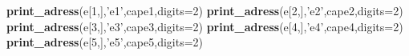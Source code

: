 \documentclass[]{article}
\newenvironment{Shaded}{\begin{snugshade}}{\end{snugshade}}
\newcommand{\KeywordTok}[1]{\textcolor[rgb]{0.13,0.29,0.53}{\textbf{{#1}}}}
\newcommand{\DataTypeTok}[1]{\textcolor[rgb]{0.13,0.29,0.53}{{#1}}}
\newcommand{\DecValTok}[1]{\textcolor[rgb]{0.00,0.00,0.81}{{#1}}}
\newcommand{\StringTok}[1]{\textcolor[rgb]{0.31,0.60,0.02}{{#1}}}
\newcommand{\NormalTok}[1]{{#1}}
\begin{document}
\begin{Shaded}
\begin{Highlighting}[]
\KeywordTok{print_adress}\NormalTok{(e[}\DecValTok{1}\NormalTok{,],}\StringTok{'e1'}\NormalTok{,cape1,}\DataTypeTok{digits=}\DecValTok{2}\NormalTok{)}
\KeywordTok{print_adress}\NormalTok{(e[}\DecValTok{2}\NormalTok{,],}\StringTok{'e2'}\NormalTok{,cape2,}\DataTypeTok{digits=}\DecValTok{2}\NormalTok{)}
\KeywordTok{print_adress}\NormalTok{(e[}\DecValTok{3}\NormalTok{,],}\StringTok{'e3'}\NormalTok{,cape3,}\DataTypeTok{digits=}\DecValTok{2}\NormalTok{)}
\KeywordTok{print_adress}\NormalTok{(e[}\DecValTok{4}\NormalTok{,],}\StringTok{'e4'}\NormalTok{,cape4,}\DataTypeTok{digits=}\DecValTok{2}\NormalTok{)}
\KeywordTok{print_adress}\NormalTok{(e[}\DecValTok{5}\NormalTok{,],}\StringTok{'e5'}\NormalTok{,cape5,}\DataTypeTok{digits=}\DecValTok{2}\NormalTok{)}
\end{Highlighting}
\end{Shaded}
\end{document}
